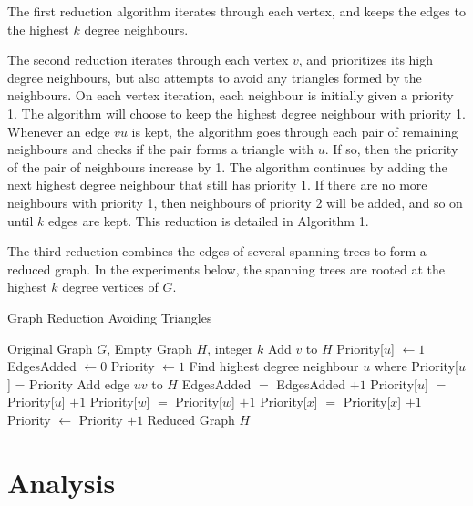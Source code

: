\documentclass[11pt]{article}
\begin{document}
The first reduction algorithm iterates through each vertex, and keeps the edges to the highest $k$ degree neighbours.

The second reduction iterates through each vertex $v$, and prioritizes its high degree neighbours, but also attempts to avoid any triangles formed by the neighbours.  On each vertex iteration, each neighbour is initially given a priority 1.  The algorithm will choose to keep the highest degree neighbour with priority 1.  Whenever an edge $vu$ is kept, the algorithm goes through each pair of remaining neighbours and checks if the pair forms a triangle with $u$.  If so, then the priority of the pair of neighbours increase by 1.  The algorithm continues by adding the next highest degree neighbour that still has priority 1.  If there are no more neighbours with priority 1, then neighbours of priority 2 will be added, and so on until $k$ edges are kept.  This reduction is detailed in Algorithm 1.

The third reduction combines the edges of several spanning trees to form a reduced graph.  In the experiments below, the spanning trees are rooted at the highest $k$ degree vertices of $G$.

\begin{algorithm}
\caption{Graph Reduction Avoiding Triangles}
\begin{algorithmic}[1]
	\REQUIRE Original Graph $G$, Empty Graph $H$, integer $k$
		\STATE Add $v$ to $H$
			\STATE Priority[$u$] $\leftarrow 1$
		\ENDFOR
		\STATE EdgesAdded $\leftarrow 0$
		\STATE Priority $\leftarrow 1$
			\STATE Find highest degree neighbour $u$ where Priority[$u$] = Priority
			\STATE Add edge $uv$ to $H$
			\STATE EdgesAdded $=$ EdgesAdded $+1$
					\STATE Priority[$u$] $=$ Priority[$u$] $+1$
					\STATE Priority[$w$] $=$ Priority[$w$] $+1$
					\STATE Priority[$x$] $=$ Priority[$x$] $+1$
				\ENDIF
			\ENDFOR
			\STATE Priority $\leftarrow$ Priority $+ 1$
		\ENDWHILE
	\ENDFOR
	\ENSURE Reduced Graph $H$
\end{algorithmic}
\end{algorithm}

\section{Analysis}
\end{document}
